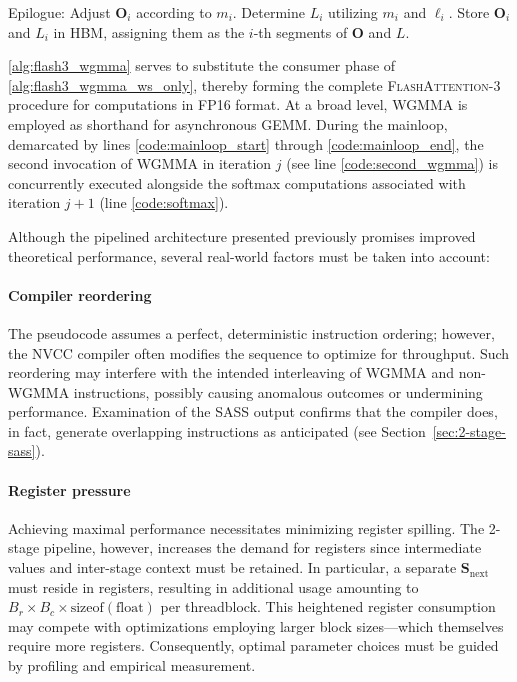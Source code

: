 \begin{algorithm}[H]
\begin{algorithmic}[1]
\STATE Epilogue: Adjust $\mathbf{O}_{i}$ according to $m_{i}$. Determine $L_{i}$ utilizing $m_{i}$ and $\ell_{i}$.
Store $\mathbf{O}_{i}$ and $L_{i}$ in HBM, assigning them as the $i$-th segments of $\mathbf{O}$ and $L$.

\cref{alg:flash3_wgmma} serves to substitute the consumer phase of \cref{alg:flash3_wgmma_ws_only}, thereby forming the complete \textsc{FlashAttention-3} procedure for computations in FP16 format. At a broad level, WGMMA is employed as shorthand for asynchronous GEMM. During the mainloop, demarcated by lines \ref{code:mainloop_start} through \ref{code:mainloop_end}, the second invocation of WGMMA in iteration $j$ (see line \ref{code:second_wgmma}) is concurrently executed alongside the softmax computations associated with iteration $j+1$ (line \ref{code:softmax}).

Although the pipelined architecture presented previously promises improved theoretical performance, several real-world factors must be taken into account:

\paragraph{Compiler reordering} The pseudocode assumes a perfect, deterministic instruction ordering; however, the NVCC compiler often modifies the sequence to optimize for throughput. Such reordering may interfere with the intended interleaving of WGMMA and non-WGMMA instructions, possibly causing anomalous outcomes or undermining performance. Examination of the SASS output confirms that the compiler does, in fact, generate overlapping instructions as anticipated (see Section~\ref{sec:2-stage-sass}).

\paragraph{Register pressure} Achieving maximal performance necessitates minimizing register spilling. The 2-stage pipeline, however, increases the demand for registers since intermediate values and inter-stage context must be retained. In particular, a separate $\mathbf{S}_{\mathrm{next}}$ must reside in registers, resulting in additional usage amounting to $B_r \times B_c \times \text{sizeof}(\text{float})$ per threadblock. This heightened register consumption may compete with optimizations employing larger block sizes—which themselves require more registers. Consequently, optimal parameter choices must be guided by profiling and empirical measurement.


\end{algorithmic}
\end{algorithm}
